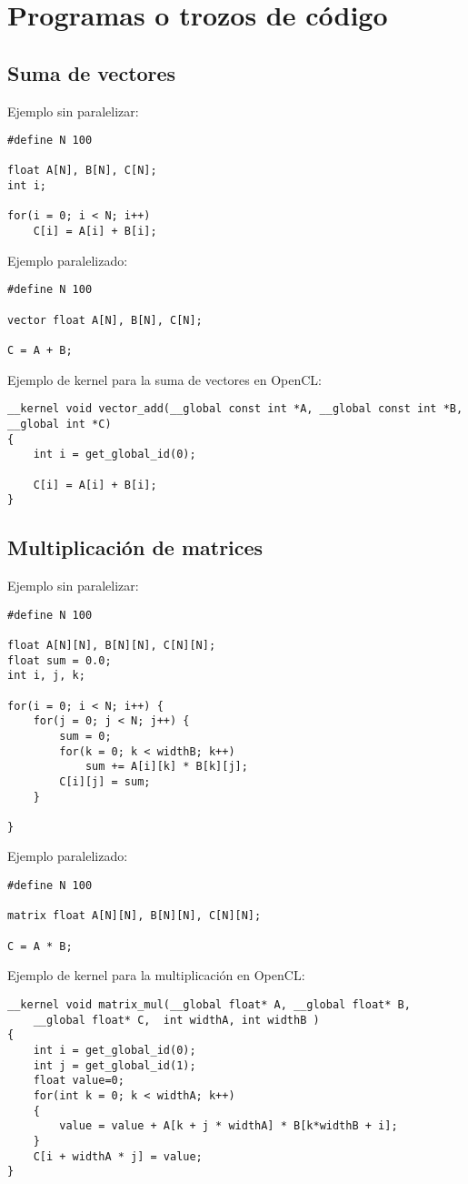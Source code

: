 \documentclass[12pt,a4paper]{article}
\begin{document}
\section{Programas o trozos de código}
\subsection{Suma de vectores}
Ejemplo sin paralelizar:
\begin{lstlisting}
#define N 100

float A[N], B[N], C[N];
int i;

for(i = 0; i < N; i++)
    C[i] = A[i] + B[i];
\end{lstlisting}

Ejemplo paralelizado:
\begin{lstlisting}
#define N 100

vector float A[N], B[N], C[N];

C = A + B;
\end{lstlisting}

Ejemplo de kernel para la suma de vectores en OpenCL:
\begin{lstlisting}
__kernel void vector_add(__global const int *A, __global const int *B, __global int *C)
{ 
    int i = get_global_id(0);
 
    C[i] = A[i] + B[i];
}
\end{lstlisting}
\subsection{Multiplicación de matrices}
Ejemplo sin paralelizar:
\begin{lstlisting}
#define N 100

float A[N][N], B[N][N], C[N][N];
float sum = 0.0;
int i, j, k;

for(i = 0; i < N; i++) {
    for(j = 0; j < N; j++) {
        sum = 0;
        for(k = 0; k < widthB; k++)
            sum += A[i][k] * B[k][j];
        C[i][j] = sum;
    }

}
\end{lstlisting}

Ejemplo paralelizado:
\begin{lstlisting}
#define N 100

matrix float A[N][N], B[N][N], C[N][N];

C = A * B;
\end{lstlisting}

Ejemplo de kernel para la multiplicación en OpenCL:
\begin{lstlisting}
__kernel void matrix_mul(__global float* A, __global float* B, 
	__global float* C,  int widthA, int widthB )
{
    int i = get_global_id(0);
    int j = get_global_id(1);
    float value=0;
    for(int k = 0; k < widthA; k++)
    {
        value = value + A[k + j * widthA] * B[k*widthB + i];
    }
    C[i + widthA * j] = value;
}
\end{lstlisting}
\end{document}
